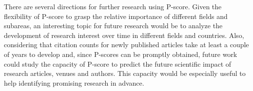 \documentclass[notitlepage]{svjour3}
\begin{document}
There are several directions for further research using P-score. 
Given the flexibility of P-score to grasp the relative importance of different fields
and subareas, an interesting topic for future research would be to analyze
the development of research interest over time in different fields and countries.
Also, considering that citation counts for newly published articles take at least a couple 
of years to develop and, since P-scores can be promptly obtained, future work
could study the capacity of P-score to predict the future
scientific impact of research articles, venues and authors. This capacity would be especially 
useful to help identifying promising research in advance.




\end{document}
